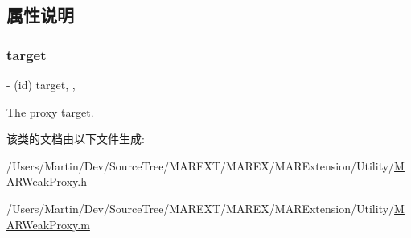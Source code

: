 \subsection{属性说明}
\mbox{\label{interface_m_a_r_weak_proxy_ab15eccc6644a15d3cc80d6f44b4af97b}} 
\subsubsection{\texorpdfstring{target}{target}}
{\footnotesize\ttfamily -\/ (id) target\hspace{0.3cm}{\ttfamily [read]}, {\ttfamily [nonatomic]}, {\ttfamily [weak]}}

The proxy target. 

该类的文档由以下文件生成\+:\begin{DoxyCompactItemize}
\item 
/\+Users/\+Martin/\+Dev/\+Source\+Tree/\+M\+A\+R\+E\+X\+T/\+M\+A\+R\+E\+X/\+M\+A\+R\+Extension/\+Utility/\hyperlink{_m_a_r_weak_proxy_8h}{M\+A\+R\+Weak\+Proxy.\+h}\item 
/\+Users/\+Martin/\+Dev/\+Source\+Tree/\+M\+A\+R\+E\+X\+T/\+M\+A\+R\+E\+X/\+M\+A\+R\+Extension/\+Utility/\hyperlink{_m_a_r_weak_proxy_8m}{M\+A\+R\+Weak\+Proxy.\+m}\end{DoxyCompactItemize}
